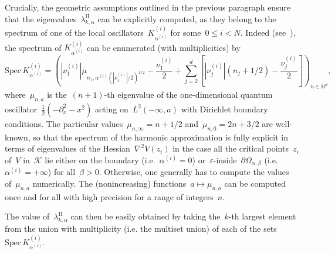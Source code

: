 \documentclass[a4]{article}
\newcommand{\N}{\mathbb N}
\newcommand{\1}{\mathbbm 1}
\newcommand{\epsLimit}[1]{\alpha^{(#1)}}
\newcommand{\hessEigval}[2]{\nu^{(#1)}_{#2}} %
\begin{document}
    Crucially, the geometric assumptions outlined in the previous paragraph ensure that the eigenvalues~$\lambda_{k,\alpha}^{\mathrm{H}}$ can be explicitly computed, as they belong to the spectrum of one of the local oscillators~$K_{\alpha^{(i)}}^{(i)}$ for some~$0\leq i<N$.
    Indeed (see~\cite[Section 4.2]{BLS24}), the spectrum of $K_{\alpha^{(i)}}^{(i)}$ can be enumerated (with multiplicities) by
    \begin{equation}
        \label{eq:harmonic_l2}
        \mathrm{Spec}\,K_{\alpha^{(i)}}^{(i)}=\left(|\hessEigval{i}{1}|\mu_{n_1,\alpha^{(i)}\left(|\hessEigval{i}{1}|/2\right)^{1/2}}-\frac{\hessEigval{i}{1}}{2}+\sum_{j=2}^d\left[|\hessEigval{i}{j}|(n_j+1/2)-\frac{\hessEigval{i}{j}}{2}\right]\right)_{n\in\N^d},
    \end{equation}
    where~$\mu_{n,a}$ is the~$(n+1)$-th eigenvalue of the one-dimensional quantum oscillator~$\frac12(-\partial_x^2-x^2)$ acting on~$L^2(-\infty,a)$ with Dirichlet boundary conditions.
    The particular values~$\mu_{n,\infty}=n+1/2$ and~$\mu_{n,0}=2n+3/2$ are well-known, so that the spectrum of the harmonic approximation is fully explicit in terms of eigenvalues of the Hessian~$\nabla^2 V(z_i)$ in the case all the critical points~$z_i$ of~$V$ in~$\mathcal K$ lie either on the boundary (i.e.~$\epsLimit{i}=0$) or~$\varepsilon$-inside~$\partial\Omega_{\alpha,\beta}$ (i.e.~$\epsLimit{i}=+\infty$) for all~$\beta>0$. Otherwise, one generally has to compute the values of~$\mu_{n,a}$ numerically. The (nonincreasing) functions~$a\mapsto \mu_{n,a}$ can be computed once and for all with high precision for a range of integers~$n$.

    The value of~$\lambda_{k,\alpha}^{\mathrm{H}}$ can then be easily obtained by taking the~$k$-th largest element from the union with multiplicity (i.e. the multiset union) of each of the sets~$\mathrm{Spec}\,K_{\alpha^{(i)}}^{(i)}$.
    
\end{document}
